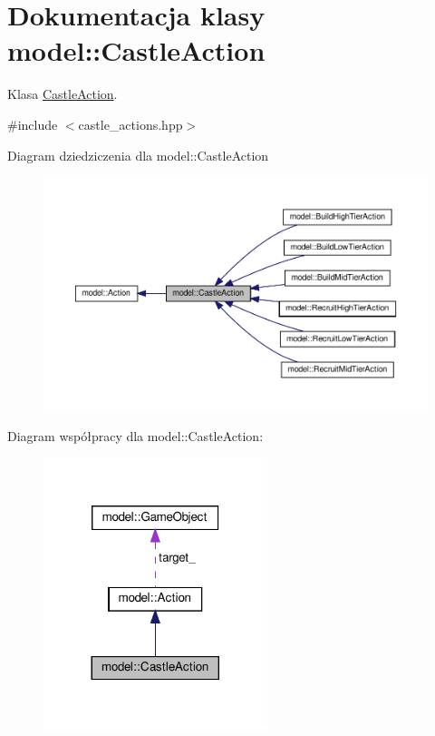 \hypertarget{classmodel_1_1CastleAction}{}\section{Dokumentacja klasy model\+:\+:Castle\+Action}
\label{classmodel_1_1CastleAction}


Klasa \hyperlink{classmodel_1_1CastleAction}{Castle\+Action}.  




{\ttfamily \#include $<$castle\+\_\+actions.\+hpp$>$}



Diagram dziedziczenia dla model\+:\+:Castle\+Action\nopagebreak
\begin{figure}[H]
\begin{center}
\leavevmode
\includegraphics[width=350pt]{classmodel_1_1CastleAction__inherit__graph}
\end{center}
\end{figure}


Diagram współpracy dla model\+:\+:Castle\+Action\+:\nopagebreak
\begin{figure}[H]
\begin{center}
\leavevmode
\includegraphics[width=185pt]{classmodel_1_1CastleAction__coll__graph}
\end{center}
\end{figure}
